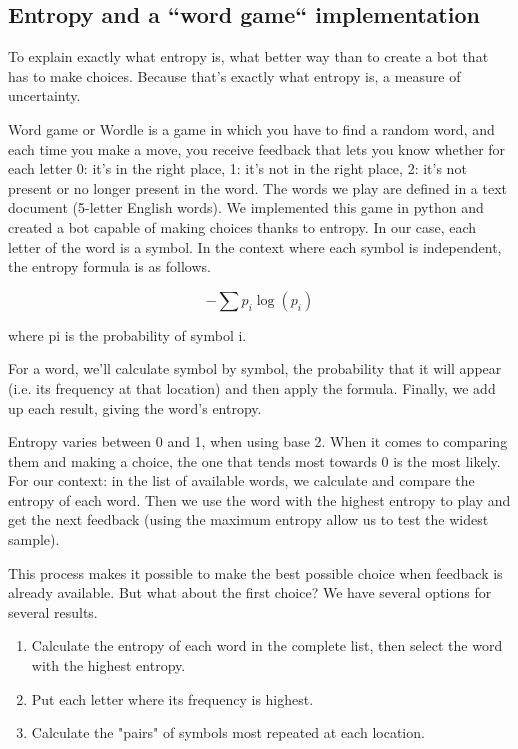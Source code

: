 \subsection{Entropy and a ``word game`` implementation}

To explain exactly what entropy is, what better way than to create a bot that has to make choices. Because that's exactly what entropy is, a measure of uncertainty.

Word game or Wordle is a game in which you have to find a random word, and each time you make a move, you receive feedback that lets you know whether for each letter 0: it's in the right place, 1: it's not in the right place, 2: it's not present or no longer present in the word. The words we play are defined in a text document (5-letter English words).
We implemented this game in python and created a bot capable of making choices thanks to entropy.
In our case, each letter of the word is a symbol.
In the context where each symbol is independent, the entropy formula is as follows.

$$-\sum p_i \log(p_i)$$

where pi is the probability of symbol i.

For a word, we'll calculate symbol by symbol, the probability that it will appear (i.e. its frequency at that location) and then apply the formula. Finally, we add up each result, giving the word's entropy.
 
Entropy varies between 0 and 1, when using base 2. When it comes to comparing them and making a choice, the one that tends most towards 0 is the most likely. 
For our context: in the list of available words, we calculate and compare the entropy of each word. Then we use the word with the highest entropy to play and get the next feedback (using the maximum entropy allow us to test the widest sample). 

This process makes it possible to make the best possible choice when feedback is already available. But what about the first choice? We have several options for several results. 

\begin{enumerate}
    \item Calculate the entropy of each word in the complete list, then select the word with the highest entropy.
    \item Put each letter where its frequency is highest.
    \item Calculate the "pairs" of symbols most repeated at each location.
\end{enumerate}

